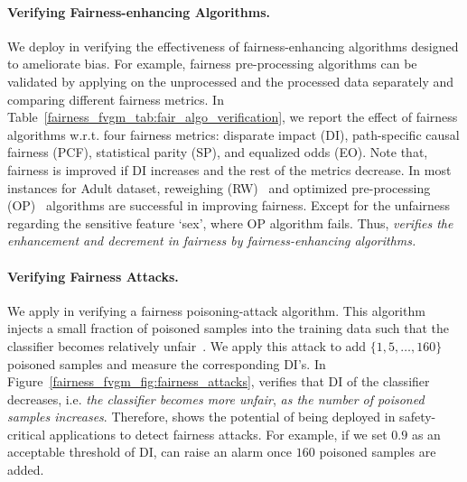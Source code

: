 \paragraph{Verifying Fairness-enhancing Algorithms.} We deploy {\fvgm} in verifying the effectiveness of fairness-enhancing algorithms designed to ameliorate bias. For example, fairness 
pre-processing algorithms can be validated by applying {\fvgm} on the unprocessed and the processed data separately and comparing different fairness metrics. In Table~\ref{fairness_fvgm_tab:fair_algo_verification}, we report the effect of fairness algorithms w.r.t. four fairness metrics: disparate impact (DI), path-specific causal fairness (PCF), statistical parity (SP), and equalized odds (EO). Note that, fairness is improved if DI increases and the rest of the metrics decrease. In most instances for Adult dataset, reweighing (RW)~\cite{kamiran2012data} and optimized pre-processing (OP)~\cite{calmon2017optimized} algorithms are successful in improving fairness. Except for the unfairness regarding the sensitive feature `sex', where OP algorithm fails. Thus, \textit{{\fvgm} verifies the enhancement and decrement in fairness by  fairness-enhancing algorithms. }


\paragraph{Verifying Fairness Attacks.}
We apply {\fvgm} in verifying a fairness poisoning-attack algorithm. This algorithm injects a small fraction of poisoned samples into the training data such that the classifier becomes relatively unfair~\cite{solans2020poisoning}. We apply this attack to add $\{1, 5, \dots, 160\}$ poisoned samples  and measure the corresponding DI's. In Figure~\ref{fairness_fvgm_fig:fairness_attacks},  {\fvgm} verifies that DI of the classifier decreases, i.e.\textit{ the classifier becomes more unfair},\textit{ as the number of poisoned samples increases}. Therefore, {\fvgm} shows the potential of being deployed in safety-critical applications to detect fairness attacks. For example, if we set $0.9$ as an acceptable threshold of DI, {\fvgm} can raise an alarm once $160$ poisoned samples are added.


